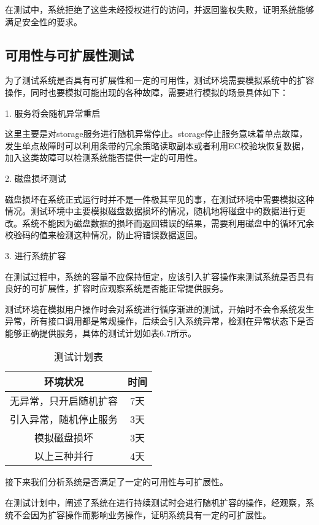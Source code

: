 在测试中，系统拒绝了这些未经授权进行的访问，并返回鉴权失败，证明系统能够满足安全性的要求。

\subsection{可用性与可扩展性测试}%

为了测试系统是否具有可扩展性和一定的可用性，测试环境需要模拟系统中的扩容操作，同时也要模拟可能出现的各种故障，需要进行模拟的场景具体如下：

1. 服务将会随机异常重启

这里主要是对storage服务进行随机异常停止。storage停止服务意味着单点故障，发生单点故障时可以利用条带的冗余策略读取副本或者利用EC校验块恢复数据，加入这类故障可以检测系统能否提供一定的可用性。

2. 磁盘损坏测试

磁盘损坏在系统正式运行时并不是一件极其罕见的事，在测试环境中需要模拟这种情况。测试环境中主要模拟磁盘数据损坏的情况，随机地将磁盘中的数据进行更改。系统不能因为磁盘数据的损坏而返回错误的结果，需要利用磁盘中的循环冗余校验码的值来检测这种情况，防止将错误数据返回。

3. 进行系统扩容

在测试过程中，系统的容量不应保持恒定，应该引入扩容操作来测试系统是否具有良好的可扩展性，扩容时应观察系统是否能正常提供服务。

测试环境在模拟用户操作时会对系统进行循序渐进的测试，开始时不会令系统发生异常，所有接口调用都是常规操作，后续会引入系统异常，检测在异常状态下是否能够正确提供服务，具体的测试计划如表6.7所示。

\begin{table}[h]
    \centering
    \caption{测试计划表}
    \begin{tabular}{cc}
      \toprule
      环境状况   & 时间   \\
      \midrule
      无异常，只开启随机扩容  & 7天  \\
      引入异常，随机停止服务  & 3天     \\
      模拟磁盘损坏           & 3天  \\
      以上三种并行           & 4天     \\
      \bottomrule
    \end{tabular}
\end{table}

接下来我们分析系统是否满足了一定的可用性与可扩展性。

在测试计划中，阐述了系统在进行持续测试时会进行随机扩容的操作，经观察，系统不会因为扩容操作而影响业务操作，证明系统具有一定的可扩展性。

